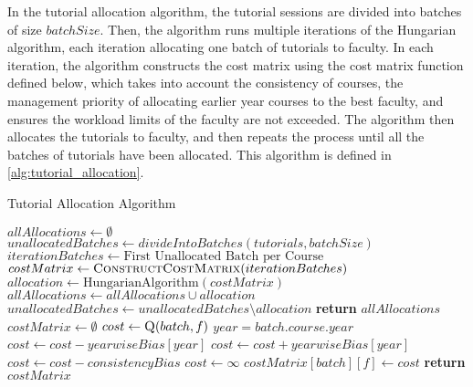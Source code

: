 In the tutorial allocation algorithm, the tutorial sessions are divided into batches of size $batchSize$. Then, the algorithm runs multiple iterations of the Hungarian algorithm, each iteration allocating one batch of tutorials to faculty. In each iteration, the algorithm constructs the cost matrix using the cost matrix function defined below, which takes into account the consistency of courses, the management priority of allocating earlier year courses to the best faculty, and ensures the workload limits of the faculty are not exceeded. The algorithm then allocates the tutorials to faculty, and then repeats the process until all the batches of tutorials have been allocated. This algorithm is defined in \autoref{alg:tutorial_allocation}.

\begin{algorithm}[H]
  \caption{Tutorial Allocation Algorithm}
  \begin{algorithmic}
    \State $allAllocations \gets \emptyset$
    \State $unallocatedBatches \gets divideIntoBatches(tutorials, batchSize)$
    \State $iterationBatches \gets \text{First Unallocated Batch per Course}$
    \State $costMatrix \gets \Call{ConstructCostMatrix}{iterationBatches}$
    \State $allocation \gets \text{HungarianAlgorithm}(costMatrix)$
    \State $allAllocations \gets allAllocations \cup allocation$
    \State $unallocatedBatches \gets unallocatedBatches \setminus allocation$
    \EndWhile
    \State \textbf{return} $allAllocations$
    \EndProcedure
    \\
    \State $costMatrix \gets \emptyset$
    \State $cost \gets \Call{Q}{batch, f}$
    \State $year = batch.course.year$
    \State $cost \gets cost - yearwiseBias[year]$
    \Else
    \State $cost \gets cost + yearwiseBias[year]$
    \EndIf
    \State $cost \gets cost - consistencyBias$
    \EndIf
    \State $cost \gets \infty$
    \EndIf
    \State $costMatrix[batch][f] \gets cost$
    \EndFor
    \EndFor
    \State \textbf{return} $costMatrix$
    \EndProcedure
  \end{algorithmic}
  \label{alg:tutorial_allocation}
\end{algorithm}

